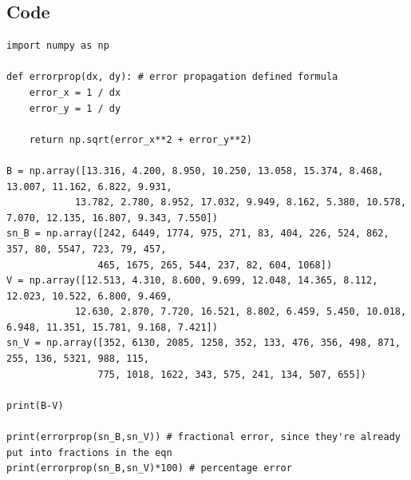 \documentclass[12pt]{article}
\begin{document}
\subsection*{Code}

\begin{center}

\begin{minipage}{\linewidth}
\captionsetup{hypcap=false}

\begin{mintedbox}
\begin{verbatim}
import numpy as np

def errorprop(dx, dy): # error propagation defined formula
    error_x = 1 / dx
    error_y = 1 / dy

    return np.sqrt(error_x**2 + error_y**2)

B = np.array([13.316, 4.200, 8.950, 10.250, 13.058, 15.374, 8.468, 13.007, 11.162, 6.822, 9.931, 
            13.782, 2.780, 8.952, 17.032, 9.949, 8.162, 5.380, 10.578, 7.070, 12.135, 16.807, 9.343, 7.550])
sn_B = np.array([242, 6449, 1774, 975, 271, 83, 404, 226, 524, 862, 357, 80, 5547, 723, 79, 457, 
                465, 1675, 265, 544, 237, 82, 604, 1068])
V = np.array([12.513, 4.310, 8.600, 9.699, 12.048, 14.365, 8.112, 12.023, 10.522, 6.800, 9.469, 
            12.630, 2.870, 7.720, 16.521, 8.802, 6.459, 5.450, 10.018, 6.948, 11.351, 15.781, 9.168, 7.421])
sn_V = np.array([352, 6130, 2085, 1258, 352, 133, 476, 356, 498, 871, 255, 136, 5321, 988, 115, 
                775, 1018, 1622, 343, 575, 241, 134, 507, 655])

print(B-V)

print(errorprop(sn_B,sn_V)) # fractional error, since they're already put into fractions in the eqn
print(errorprop(sn_B,sn_V)*100) # percentage error

\end{verbatim}
\end{mintedbox}

\end{minipage}


\end{center}
\end{document}
